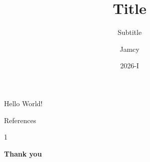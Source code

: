 \documentclass[aspectratio=169]{beamer}
\title{Title}
\subtitle{Subtitle}
\author{Jamcy}
\institute{UTEC}
\date{2026-I}
\begin{document}

\begin{frame}{Hello World!}
\end{frame}

\begin{frame}[allowframebreaks]{References}
    \footnotesize
    \begin{thebibliography}{1}
    \end{thebibliography}
\end{frame}


\begin{frame}[plain]
    \centering
    \vspace{2cm}
    {\color{white}\Huge\bfseries Thank you\par}
    \vspace{0.8em}
\end{frame}
\end{document}
